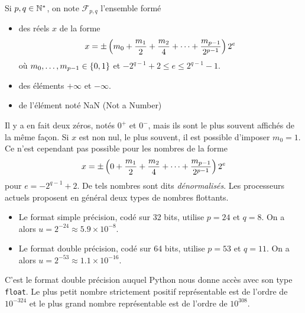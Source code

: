 \documentclass{magnolia}
\begin{document}
\begin{definition}
Si $p,q\in{\mathbb{N}^*}$, on note $\mathcal{F}_{p,q}$ l'ensemble form\'e
\begin{itemize}
\item des réels $x$ de la forme
\[x=\pm\left(m_0+\frac{m_1}{2}+\frac{m_2}{4}+\cdots+\frac{m_{p-1}}{2^{p-1}}\right) 2^e\]
où $m_0,\ldots,m_{p-1}\in\left\{0,1\right\}$ et $-2^{q-1}+2\leq e\leq 2^{q-1}-1$.
\item des éléments $+\infty$ et $-\infty$.
\item de l'élément noté {\sc NaN} (Not a Number)
\end{itemize}
\end{definition}

\begin{remarques}
  \remarque Il y a en fait deux zéros, notés $0^+$ et $0^-$, mais ils sont le plus
  souvent affichés de la même façon.
\remarque Si $x$ est non nul, le plus souvent, il est possible d'imposer $m_0=1$. Ce n'est
  cependant pas possible pour les nombres de la forme
  \[x=\pm\left(0+\frac{m_1}{2}+\frac{m_2}{4}+\cdots+\frac{m_{p-1}}{2^{p-1}}\right) 2^e\]
  pour $e=-2^{q-1}+2$. De tels nombres sont dits \emph{dénormalisés}.
\remarque Les processeurs actuels proposent en général deux types de nombres flottants.
  \begin{itemize}
  \item Le format simple précision, codé sur 32 bits, utilise
  $p=24$ et $q=8$. On a alors $u=2^{-24}\approx 5.9\times 10^{-8}$.
\item Le format double précision, codé sur 64 bits, utilise $p=53$ et $q=11$.
  On a alors $u=2^{-53}\approx 1.1\times10^{-16}$.
  \end{itemize}
 C'est le format double précision auquel Python nous donne accès avec son type \verb_float_.  Le plus petit nombre strictement positif représentable est de l'ordre de $10^{-324}$ et le plus grand nombre représentable est de l'ordre de $10^{308}$.


\end{remarques}
\end{document}

